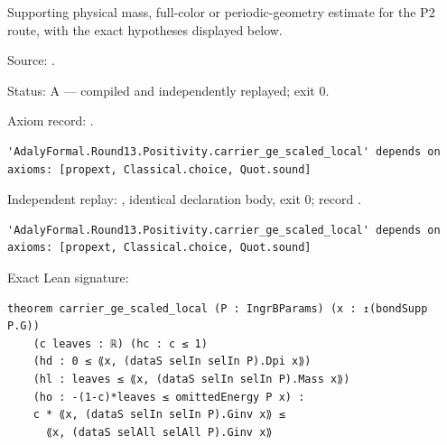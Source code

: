 \begin{theorem}[bp-454]
\label{bp-454}
\leanok
Supporting physical mass, full-color or periodic-geometry estimate for the P2 route, with the exact hypotheses displayed below.

\par Source: \texttt{}.
\par Status: A — compiled and independently replayed; exit 0.
\par Axiom record: \texttt{}.
\begin{verbatim}
'AdalyFormal.Round13.Positivity.carrier_ge_scaled_local' depends on axioms: [propext, Classical.choice, Quot.sound]
\end{verbatim}
\par Independent replay: \texttt{}, identical declaration body, exit 0; record \texttt{}.
\begin{verbatim}
'AdalyFormal.Round13.Positivity.carrier_ge_scaled_local' depends on axioms: [propext, Classical.choice, Quot.sound]
\end{verbatim}
\par Exact Lean signature:
\begin{verbatim}
theorem carrier_ge_scaled_local (P : IngrBParams) (x : ↥(bondSupp P.G))
    (c leaves : ℝ) (hc : c ≤ 1)
    (hd : 0 ≤ ⟪x, (dataS selIn selIn P).Dpi x⟫)
    (hl : leaves ≤ ⟪x, (dataS selIn selIn P).Mass x⟫)
    (ho : -(1-c)*leaves ≤ omittedEnergy P x) :
    c * ⟪x, (dataS selIn selIn P).Ginv x⟫ ≤
      ⟪x, (dataS selAll selAll P).Ginv x⟫
\end{verbatim}
\end{theorem}

